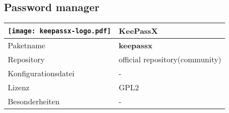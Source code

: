 \subsection{Password manager}
\begin{tabular}{l|l}
\texttt{[image: keepassx-logo.pdf]} & KeePassX \\ \hline
Paketname & \textbf{keepassx} \\ 
Repository & official repository(community) \\
Konfigurationsdatei & - \\
Lizenz & GPL2 \\
Besonderheiten & - \\
\end{tabular}
